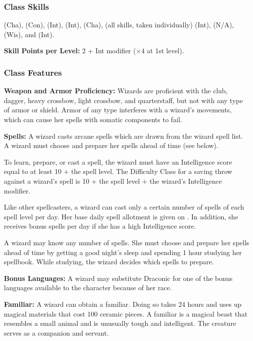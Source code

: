 \subsubsection{Class Skills}
 (Cha),  (Con),  (Int),  (Int),  (Cha),  (all skills, taken individually) (Int),  (N/A),  (Wis), and  (Int).

\textbf{Skill Points per Level:} 2 + Int modifier ($\times4$ at 1st level).

\subsubsection{Class Features}
\textbf{Weapon and Armor Proficiency:} Wizards are proficient with the club, dagger, heavy crossbow, light crossbow, and quarterstaff, but not with any type of armor or shield. Armor of any type interferes with a wizard's movements, which can cause her spells with somatic components to fail.

\textbf{Spells:} A wizard casts arcane spells which are drawn from the wizard spell list. A wizard must choose and prepare her spells ahead of time (see below).

To learn, prepare, or cast a spell, the wizard must have an Intelligence score equal to at least 10 + the spell level. The Difficulty Class for a saving throw against a wizard's spell is 10 + the spell level + the wizard's Intelligence modifier.

Like other spellcasters, a wizard can cast only a certain number of spells of each spell level per day. Her base daily spell allotment is given on . In addition, she receives bonus spells per day if she has a high Intelligence score.

A wizard may know any number of spells. She must choose and prepare her spells ahead of time by getting a good night's sleep and spending 1 hour studying her spellbook. While studying, the wizard decides which spells to prepare.

\textbf{Bonus Languages:} A wizard may substitute Draconic for one of the bonus languages available to the character because of her race.

\textbf{Familiar:} A wizard can obtain a familiar. Doing so takes 24 hours and uses up magical materials that cost 100 ceramic pieces. A familiar is a magical beast that resembles a small animal and is unusually tough and intelligent. The creature serves as a companion and servant.

